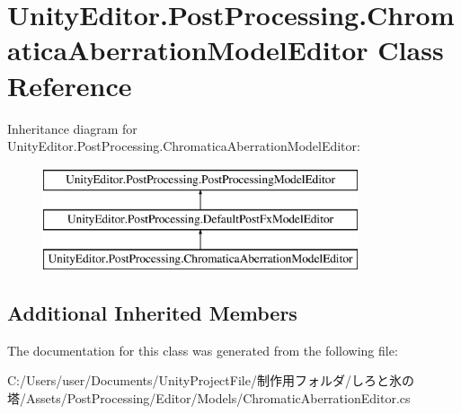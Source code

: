 \hypertarget{class_unity_editor_1_1_post_processing_1_1_chromatica_aberration_model_editor}{}\section{Unity\+Editor.\+Post\+Processing.\+Chromatica\+Aberration\+Model\+Editor Class Reference}
\label{class_unity_editor_1_1_post_processing_1_1_chromatica_aberration_model_editor}
Inheritance diagram for Unity\+Editor.\+Post\+Processing.\+Chromatica\+Aberration\+Model\+Editor\+:\begin{figure}[H]
\begin{center}
\leavevmode
\includegraphics[height=3.000000cm]{class_unity_editor_1_1_post_processing_1_1_chromatica_aberration_model_editor}
\end{center}
\end{figure}
\subsection*{Additional Inherited Members}


The documentation for this class was generated from the following file\+:\begin{DoxyCompactItemize}
\item 
C\+:/\+Users/user/\+Documents/\+Unity\+Project\+File/制作用フォルダ/しろと氷の塔/\+Assets/\+Post\+Processing/\+Editor/\+Models/Chromatic\+Aberration\+Editor.\+cs\end{DoxyCompactItemize}
